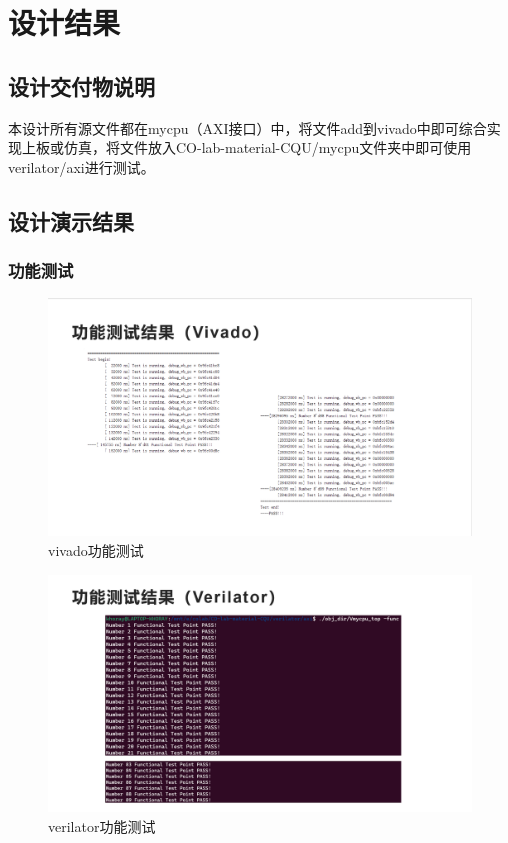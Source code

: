 \section{设计结果}

\subsection{设计交付物说明}
本设计所有源文件都在mycpu（AXI接口）中，将文件add到vivado中即可综合实现上板或仿真，将文件放入CO-lab-material-CQU/mycpu文件夹中即可使用verilator/axi进行测试。

\subsection{设计演示结果}
\subsubsection{功能测试}
\begin{figure}[H]
    \centering
    \includegraphics[width=\textwidth]{image/fun_vivado.png}
    \caption{vivado功能测试}
\end{figure}
\begin{figure}[H]
    \centering
    \includegraphics[width=\textwidth]{image/fun_veri.png}
    \caption{verilator功能测试}
\end{figure}

